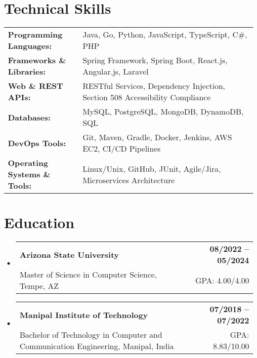 \documentclass[letterpaper,11pt]{article}
\makeatletter
\newcommand{\educationSubheading}[4]{
  \vspace{-2pt}\item
    \begin{tabular*}{1.0\textwidth}[t]{l@{\extracolsep{\fill}}r}
      \textbf{\small #1} & \textbf{\small #2} \\
      {\small#3} & {\small #4} \\
    \end{tabular*}\vspace{-7pt}
}
\newcommand{\resumeSubHeadingListStart}{\begin{itemize}[leftmargin=0pt, label={}]}
\newcommand{\resumeSubHeadingListEnd}{\end{itemize}}
\makeatother
\begin{document}
\section{Technical Skills}
        \vspace{-14pt}
        \begin{table}[h]
            \footnotesize
            \begin{tabular}{p{0.3\linewidth} p{0.7\linewidth}}
                \textbf{Programming Languages:} & Java, Go, Python, JavaScript, TypeScript, C\#, PHP \\
                \textbf{Frameworks \& Libraries:} & Spring Framework, Spring Boot, React.js, Angular.js, Laravel \\
                \textbf{Web \& REST APIs:} & RESTful Services, Dependency Injection, Section 508 Accessibility Compliance \\
                \textbf{Databases:} & MySQL, PostgreSQL, MongoDB, DynamoDB, SQL \\
                \textbf{DevOps Tools:} & Git, Maven, Gradle, Docker, Jenkins, AWS EC2, CI/CD Pipelines \\
                \textbf{Operating Systems \& Tools:} & Linux/Unix, GitHub, JUnit, Agile/Jira, Microservices Architecture \\
            \end{tabular}
        \end{table}

 \vspace{-15pt}

\section{Education}
  \resumeSubHeadingListStart
    \educationSubheading
      {Arizona State University}{08/2022 -- 05/2024}
      {Master of Science in Computer Science, Tempe, AZ}{GPA: 4.00/4.00}

    \educationSubheading
      {Manipal Institute of Technology}{07/2018 -- 07/2022}
      {Bachelor of Technology in Computer and Communication Engineering, Manipal, India}{GPA: 8.83/10.00}
  \resumeSubHeadingListEnd
\end{document}
